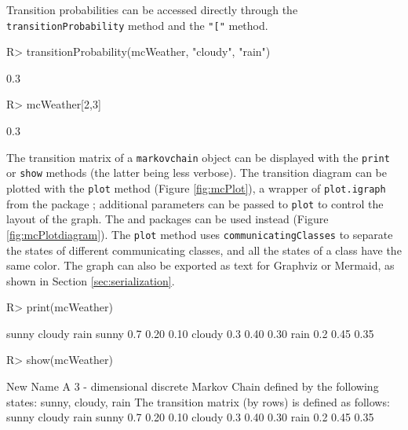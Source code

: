 \documentclass[
  nojss]{jss}
\begin{document}
Transition probabilities can be accessed directly through the \texttt{transitionProbability} method and the \texttt{"{[}"} method.

\begin{CodeChunk}
\begin{CodeInput}
R> transitionProbability(mcWeather, "cloudy", "rain")
\end{CodeInput}
\begin{CodeOutput}
[1] 0.3
\end{CodeOutput}
\begin{CodeInput}
R> mcWeather[2,3]
\end{CodeInput}
\begin{CodeOutput}
[1] 0.3
\end{CodeOutput}
\end{CodeChunk}

The transition matrix of a \texttt{markovchain} object can be displayed with the \texttt{print} or \texttt{show} methods (the latter being less verbose). The transition diagram can be plotted with the \texttt{plot} method (Figure \ref{fig:mcPlot}), a wrapper of \texttt{plot.igraph} from the  package \citep{pkg:igraph}; additional parameters can be passed to \texttt{plot} to control the layout of the graph. The  and  packages can be used instead (Figure \ref{fig:mcPlotdiagram}). The \texttt{plot} method uses \texttt{communicatingClasses} to separate the states of different communicating classes, and all the states of a class have the same color. The graph can also be exported as text for Graphviz or Mermaid, as shown in Section \ref{sec:serialization}.

\begin{CodeChunk}
\begin{CodeInput}
R> print(mcWeather)
\end{CodeInput}
\begin{CodeOutput}
       sunny cloudy rain
sunny    0.7   0.20 0.10
cloudy   0.3   0.40 0.30
rain     0.2   0.45 0.35
\end{CodeOutput}
\begin{CodeInput}
R> show(mcWeather)
\end{CodeInput}
\begin{CodeOutput}
New Name 
 A  3 - dimensional discrete Markov Chain defined by the following states: 
 sunny, cloudy, rain 
 The transition matrix  (by rows)  is defined as follows: 
       sunny cloudy rain
sunny    0.7   0.20 0.10
cloudy   0.3   0.40 0.30
rain     0.2   0.45 0.35
\end{CodeOutput}
\end{CodeChunk}
\end{document}

